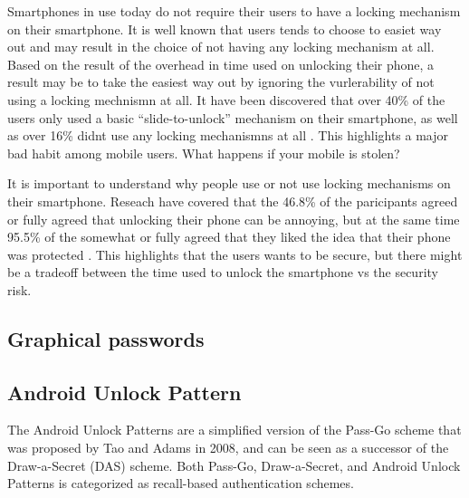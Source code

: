   Smartphones in use today do not require their users to have a locking mechanism on their smartphone. It is well known that users tends to choose to easiet way out and may result in the choice of not having any locking mechanism at all. Based on the result of the overhead in time used on unlocking their phone, a result may be to take the easiest way out by ignoring the vurlerability of not using a locking mechnismn at all. It have been discovered that over 40\% of the users only used a basic ``slide-to-unlock'' mechanism on their smartphone, as well as over 16\% didnt use any locking mechanismns at all \cite{habits3}. This highlights a major bad habit among mobile users. What happens if your mobile is stolen? 

  It is important to understand why people use or not use locking mechanisms on their smartphone. Reseach have covered that the 46.8\% of the paricipants agreed or fully agreed that unlocking their phone can be annoying, but at the same time 95.5\% of the somewhat or fully agreed that they liked the idea that their phone was protected \cite{habits3}. This highlights that the users wants to be secure, but there might be a tradeoff between the time used to unlock the smartphone vs the security risk.








    







  \subsection{Graphical passwords}




  \subsection{Android Unlock Pattern}

    The Android Unlock Patterns are a simplified version of the Pass-Go scheme that was proposed by Tao and Adams in 2008, and can be seen as a successor of the Draw-a-Secret (DAS) scheme. Both Pass-Go, Draw-a-Secret, and Android Unlock Patterns is categorized as recall-based authentication schemes.

